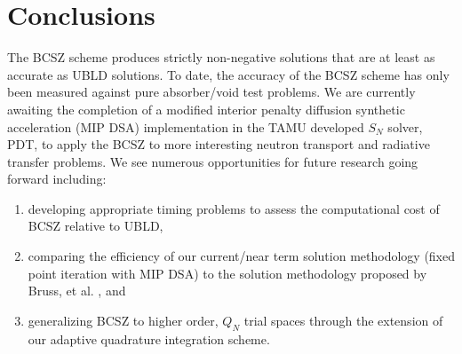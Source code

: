 \documentclass{mc2015}
\begin{document}
\section{Conclusions}
\label{sec:conclusions}
The BCSZ scheme produces strictly non-negative solutions that are at least as accurate as UBLD solutions.
To date, the accuracy of the BCSZ scheme has only been measured against pure absorber/void test problems.  
We are currently awaiting the completion of a modified interior penalty  diffusion synthetic acceleration (MIP DSA) \cite{hackemack} implementation in the TAMU developed $S_N$ solver, PDT\cite{pdt}, to apply the BCSZ to more interesting neutron transport and radiative transfer problems.
We see numerous opportunities for future research going forward including:
\begin{enumerate}
\item developing appropriate timing problems to assess the computational cost of BCSZ relative to UBLD,
\item comparing the efficiency of our current/near term solution methodology (fixed point iteration with MIP DSA) to the solution methodology proposed by Bruss, et al. \cite{csz_don}, and
\item generalizing BCSZ to higher order, $Q_N$ trial spaces through the extension of our adaptive quadrature integration scheme.
\end{enumerate}



\end{document}
